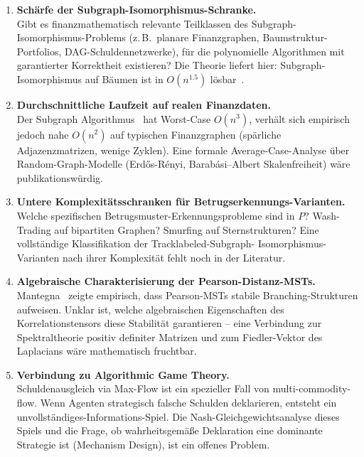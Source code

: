 \documentclass[a4paper,12pt]{article}
\begin{document}
\begin{enumerate}
    \item \textbf{Schärfe der Subgraph-Isomorphismus-Schranke.}\\
    Gibt es finanzmathematisch relevante Teilklassen des
    Subgraph-Isomorphismus-Pro\-blems (z.\,B.\ planare Finanzgraphen,
    Baumstruktur-Portfolios, DAG-Schuldennetz\-werke), für die polynomielle
    Algorithmen mit garantierter Korrektheit existieren? Die Theorie
    liefert hier: Subgraph-Isomorphismus auf Bäumen ist in
    $O(n^{1.5})$ lösbar~\cite{cormen2022}.

    \item \textbf{Durchschnittliche Laufzeit auf realen Finanzdaten.}\\
    Der Subgraph Algorithmus~\cite{subgraph} hat Worst-Case
    $O(n^3)$, verhält sich empirisch jedoch nahe $O(n^2)$ auf
    typischen Finanzgraphen (spärliche Adjazenzmatrizen, wenige
    Zyklen). Eine formale Average-Case-Analyse über Random-Graph-Modelle
    (Erdős-Rényi, Barabási–Albert Skalenfreiheit) wäre publikationswürdig.

    \item \textbf{Untere Komplexitätsschranken für Betrugserkennungs-Varianten.}\\
    Welche spezifischen Betrugsmuster-Erkennungsprobleme sind in $P$?
    Wash-Trading auf bipartiten Graphen? Smurfing auf Sternstrukturen?
    Eine vollständige Klassifikation der Tracklabeled-Subgraph-
    Isomorphismus-Varianten nach ihrer Komplexität fehlt noch in der Literatur.

    \item \textbf{Algebraische Charakterisierung der Pearson-Distanz-MSTs.}\\
    Mantegna~\cite{mantegna1999} zeigte empirisch, dass Pearson-MSTs
    stabile Branching-Strukturen aufweisen. Unklar ist, welche
    algebraischen Eigenschaften des Korrelationstensors diese Stabilität
    garantieren – eine Verbindung zur Spektraltheorie positiv definiter
    Matrizen und zum Fiedler-Vektor des Laplacians wäre mathematisch
    fruchtbar.

    \item \textbf{Verbindung zu Algorithmic Game Theory.}\\
    Schuldenausgleich via Max-Flow ist ein spezieller Fall von
    multi-commodity-flow. Wenn Agenten strategisch falsche Schulden
    deklarieren, entsteht ein unvollständiges-Informations-Spiel.
    Die Nash-Gleichgewichtsanalyse dieses Spiels und die Frage,
    ob wahrheitsgemäße Deklaration eine dominante Strategie ist
    (Mechanism Design), ist ein offenes Problem.
\end{enumerate}
\end{document}
